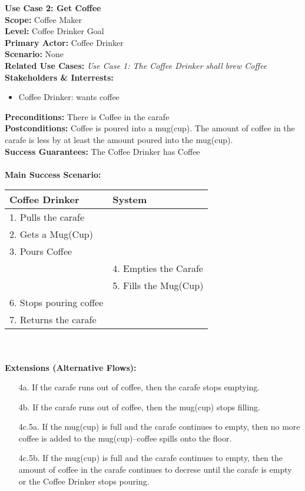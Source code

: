\documentclass[letterpaper]{article}
\begin{document}
\noindent
\textbf{Use Case 2: Get Coffee}\\
\textbf{Scope: }Coffee Maker\\
\textbf{Level: }Coffee Drinker Goal\\
\textbf{Primary Actor: }Coffee Drinker\\
\textbf{Scenario: }None\\
\textbf{Related Use Cases:  }\textit{Use Case 1:  The Coffee Drinker
shall brew Coffee}\\
\textbf{Stakeholders \& Interrests: }
\begin{itemize}
\item Coffee Drinker:  wants coffee
\end{itemize}
\textbf{Preconditions: }There is Coffee in the carafe\\
\textbf{Postconditions: }Coffee is poured into a mug(cup).  The amount
of coffee in the carafe is less by at least the amount poured into the
mug(cup).\\
\textbf{Success Guarantees: }The Coffee Drinker has Coffee\\\\
\textbf{Main Success Scenario:  }\\
\begin{tabular}{|p{5.75cm}|p{5.75cm}|}\hline
\textbf{Coffee Drinker} & \textbf{System}\\\hline
1.  Pulls the carafe & \\\hline
2.  Gets a Mug(Cup) & \\\hline
3.  Pours Coffee & \\\hline
 & 4. Empties the Carafe\\\hline
 & 5. Fills the Mug(Cup)\\\hline
6. Stops pouring coffee & \\\hline
7. Returns the carafe & \\\hline
\end{tabular}\\\\
\textbf{Extensions (Alternative Flows): }
\begin{itemize}
\item[4a.] If the carafe runs out of coffee, then the carafe stops
emptying.
\item[4b.] If the carafe runs out of coffee, then the mug(cup) stops
filling.
\item[4c.5a.]If the mug(cup) is full and the carafe continues to
empty, then no more coffee is added to the mug(cup)--coffee spills
onto the floor.
\item[4c.5b.]If the mug(cup) is full and the carafe continues to
empty, then the amount of coffee in the carafe continues to decrese
until the carafe is empty or the Coffee Drinker stops pouring.
\end{itemize}
\end{document}
